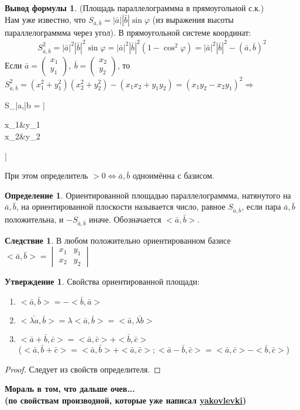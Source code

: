 \documentclass[a4paper, 12pt]{article}
\renewcommand{\phi}{\varphi}
\theoremstyle{definition}
\newtheorem*{definition}{Определение}
\newtheorem*{consequense}{Следствие}
\newtheorem*{subtheorem}{Утверждение}
\newtheorem*{formula}{Вывод формулы}
\newenvironment{boxedalign*}
  {\begin{equation*}\begin{lrbox}{\boxedalignbox}$\begin{aligned}}
  {\end{aligned}$\end{lrbox}\fbox{\usebox{\boxedalignbox}}\end{equation*}}
\begin{document}
	\begin{formula}(Площадь параллелограммма в прямоугольной с.к.)\\
		Нам уже известно, что $S_{\bar{a},\bar{b}} = |\bar{a}||\bar{b}|\sin\phi$ (из выражения высоты параллелограммма через угол). В прямоугольной системе координат:\begin{align*}
			S_{\bar{a},\bar{b}}^2 = |\bar{a}|^2|\bar{b}|^2\sin\phi = |\bar{a}|^2|\bar{b}|^2(1 - \cos^2\phi) = |\bar{a}|^2|\bar{b}|^2 - (\bar{a}, \bar{b})^2
		\end{align*}
		Если $\bar{a} = \begin{pmatrix} x_1 \\ y_1 \end{pmatrix}, \ \bar{b} = \begin{pmatrix} x_2 \\ y_2 \end{pmatrix}$, то $S_{\bar{a},\bar{b}}^2 = (x_1^2 + y_1^2)(x_2^2 + y_2^2) - (x_1x_2 + y_1y_2) = (x_1y_2 - x_2y_1)^2 \Rightarrow$ \begin{boxedalign*}S_{\bar{a},\bar{b}} = |\begin{vmatrix} x_1&y_1\\x_2&y_2 \end{vmatrix}|\end{boxedalign*}
		При этом определитель $>0 \Leftrightarrow \bar{a}, \bar{b}$ одноимённа с базисом.
	\end{formula}
	\begin{definition}
		Ориентированной площадью параллелограммма, натянутого на $\bar{a},\bar{b}$, на ориентированной плоскости называется число, равное $S_{\bar{a},\bar{b}}$, если пара $\bar{a},\bar{b}$ положительна, и $-S_{\bar{a},\bar{b}}$ иначе. Обозначается $<\bar{a}, \bar{b}>$.
	\end{definition}
	\begin{consequense}
		В любом положительно ориентированном базисе $<\bar{a}, \bar{b}> = \begin{vmatrix} x_1&y_1\\x_2&y_2 \end{vmatrix}$
	\end{consequense}
	\begin{subtheorem} Свойства ориентированной площади:
		\begin{enumerate}
			\item $<\bar{a}, \bar{b}> = -<\bar{b}, \bar{a}>$
			\item $<\bar{\lambda a}, \bar{b}> = \lambda<\bar{a}, \bar{b}> = <\bar{a}, \bar{\lambda b}>$
			\item $<\bar{a} + \bar{b}, \bar{c}> = <\bar{a}, \bar{c}> + <\bar{b}, \bar{c}>$\\
			($<\bar{a}, \bar{b} + \bar{c}> = <\bar{a}, \bar{b}> + <\bar{a}, \bar{c}>; <\bar{a} - \bar{b}, \bar{c}> = <\bar{a}, \bar{c}>-<\bar{b}, \bar{c}>$)
		\end{enumerate}
	\end{subtheorem}
	\begin{proof}
		Следует из свойств определителя.
	\end{proof}
	\bfseries Мораль в том, что дальше очев... \\(по свойствам производной, которые уже написал \href{https://github.com/yakovlevki/Calculus/blob/master/Calculus-1/calculus-1.pdf}{yakovlevki}) \mdseries
\end{document}
